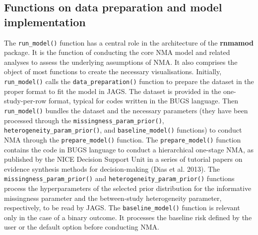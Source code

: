 \hypertarget{functions-on-data-preparation-and-model-implementation}{%
\subsection{Functions on data preparation and model implementation}\label{functions-on-data-preparation-and-model-implementation}}

The \texttt{run\_model()} function has a central role in the architecture of the \textbf{rnmamod}
package. It is the function of conducting the core NMA model and related analyses
to assess the underlying assumptions of NMA. It also comprises the object of most
functions to create the necessary visualisations. Initially, \texttt{run\_model()} calls
the \texttt{data\_preparation()} function to prepare the dataset in the proper format to
fit the model in JAGS. The dataset is provided in the one-study-per-row format,
typical for codes written in the BUGS language. Then \texttt{run\_model()} bundles the
dataset and the necessary parameters (they have been processed through the
\texttt{missingness\_param\_prior()}, \texttt{heterogeneity\_param\_prior()}, and \texttt{baseline\_model()}
functions) to conduct NMA through the \texttt{prepare\_model()} function. The \texttt{prepare\_model()}
function contains the code in BUGS language to conduct a hierarchical one-stage
NMA, as published by the NICE Decision Support Unit in a series of tutorial papers
on evidence synthesis methods for decision-making (Dias et al. 2013). The \texttt{missingness\_param\_prior()}
and \texttt{heterogeneity\_param\_prior()} functions process the hyperparameters of the
selected prior distribution for the informative missingness parameter and the
between-study heterogeneity parameter, respectively, to be read by JAGS.
The \texttt{baseline\_model()} function is relevant only in the case of a binary outcome.
It processes the baseline risk defined by the user or the default option before
conducting NMA.

